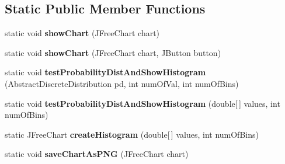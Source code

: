 \subsection*{Static Public Member Functions}
\begin{DoxyCompactItemize}
\item 
\hypertarget{classuk_1_1ac_1_1dmu_1_1iesd_1_1cascade_1_1util_1_1_chart_utils_a37b759c95373aa597f659f23eddca741}{static void {\bfseries show\-Chart} (J\-Free\-Chart chart)}\label{classuk_1_1ac_1_1dmu_1_1iesd_1_1cascade_1_1util_1_1_chart_utils_a37b759c95373aa597f659f23eddca741}

\item 
\hypertarget{classuk_1_1ac_1_1dmu_1_1iesd_1_1cascade_1_1util_1_1_chart_utils_a3b6c7b1604d861b773aac3565ca801f9}{static void {\bfseries show\-Chart} (J\-Free\-Chart chart, J\-Button button)}\label{classuk_1_1ac_1_1dmu_1_1iesd_1_1cascade_1_1util_1_1_chart_utils_a3b6c7b1604d861b773aac3565ca801f9}

\item 
\hypertarget{classuk_1_1ac_1_1dmu_1_1iesd_1_1cascade_1_1util_1_1_chart_utils_a1f466e7409dd7421a38990212027eb62}{static void {\bfseries test\-Probability\-Dist\-And\-Show\-Histogram} (Abstract\-Discrete\-Distribution pd, int num\-Of\-Val, int num\-Of\-Bins)}\label{classuk_1_1ac_1_1dmu_1_1iesd_1_1cascade_1_1util_1_1_chart_utils_a1f466e7409dd7421a38990212027eb62}

\item 
\hypertarget{classuk_1_1ac_1_1dmu_1_1iesd_1_1cascade_1_1util_1_1_chart_utils_add7e3b5ba35490799a0b69a88f21cb13}{static void {\bfseries test\-Probability\-Dist\-And\-Show\-Histogram} (double\mbox{[}$\,$\mbox{]} values, int num\-Of\-Bins)}\label{classuk_1_1ac_1_1dmu_1_1iesd_1_1cascade_1_1util_1_1_chart_utils_add7e3b5ba35490799a0b69a88f21cb13}

\item 
\hypertarget{classuk_1_1ac_1_1dmu_1_1iesd_1_1cascade_1_1util_1_1_chart_utils_a2fa594e3d0ee05ceeff76032f7a1d712}{static J\-Free\-Chart {\bfseries create\-Histogram} (double\mbox{[}$\,$\mbox{]} values, int num\-Of\-Bins)}\label{classuk_1_1ac_1_1dmu_1_1iesd_1_1cascade_1_1util_1_1_chart_utils_a2fa594e3d0ee05ceeff76032f7a1d712}

\item 
\hypertarget{classuk_1_1ac_1_1dmu_1_1iesd_1_1cascade_1_1util_1_1_chart_utils_ad30e18244fd79296e33340d9b24fa5dd}{static void {\bfseries save\-Chart\-As\-P\-N\-G} (J\-Free\-Chart chart)}\label{classuk_1_1ac_1_1dmu_1_1iesd_1_1cascade_1_1util_1_1_chart_utils_ad30e18244fd79296e33340d9b24fa5dd}


\end{DoxyCompactItemize}
